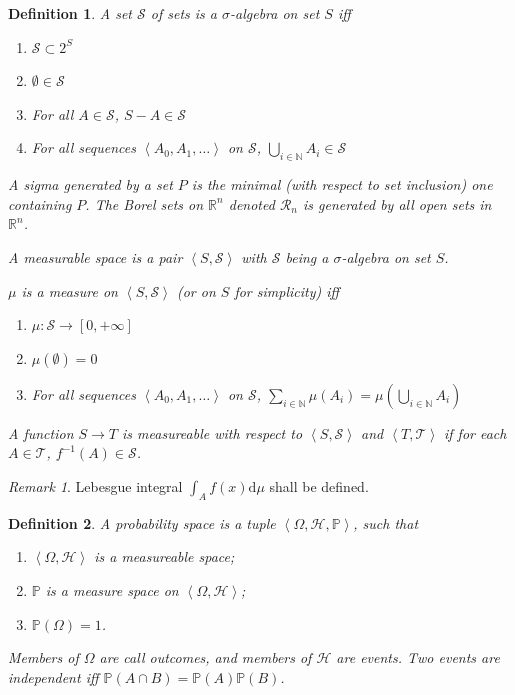 \documentclass{book}
\newtheorem{definition}{Definition}
\theoremstyle{definition}\newtheorem{mechanism}{Mechanism}
\theoremstyle{remark}\newtheorem*{remark}{Remark}
\begin{document}
\begin{definition}
	A set $\mathcal S$ of sets is a $\sigma$-algebra on set $S$ iff
	
	\begin{enumerate}
		\item $\mathcal S\subset 2^S$
		\item $\emptyset \in \mathcal S$
		\item For all $A \in \mathcal S$, $S - A \in \mathcal S$
		\item For all sequences $\left<A_0, A_1, \dots\right>$ on $\mathcal S$, $\bigcup_{i\in\mathbb N} A_i\in \mathcal S$
	\end{enumerate}
	
	A sigma generated by a set $P$ is the minimal (with respect to set inclusion) one containing $P$. The Borel sets on $\mathbb R^n$ denoted $\mathcal R_n$ is generated by all open sets in $\mathbb R^n$.
	
	A measurable space is a pair $\left<S, \mathcal S\right>$ with $\mathcal S$ being a $\sigma$-algebra on set $S$.
	
	$\mu$ is a measure on $\left<S, \mathcal S\right>$ (or on $S$ for simplicity) iff
	
	\begin{enumerate}
		\item $\mu: \mathcal S\to [0, +\infty]$
		\item $\mu(\emptyset) = 0$
		\item For all sequences $\left<A_0, A_1, \dots\right>$ on $\mathcal S$, $\sum_{i\in\mathbb N}\mu(A_i) = \mu(\bigcup_{i\in\mathbb N} A_i)$
	\end{enumerate}
	
	A function $S\to T$ is measureable with respect to $\left<S, \mathcal S\right>$ and $\left<T, \mathcal T\right>$ if for each $A\in \mathcal T$, $f^{-1}(A) \in \mathcal S$.
\end{definition}

\begin{remark}
	Lebesgue integral $\int_A f(x)\mathrm{d}\mu$ shall be defined.
\end{remark}

\begin{definition}
	A probability space is a tuple $\left<\Omega, \mathcal H, \mathbb P\right>$, such that
	
	\begin{enumerate}
		\item $\left<\Omega, \mathcal H\right>$ is a measureable space;
		\item $\mathbb P$ is a measure space on $\left<\Omega, \mathcal H\right>$;
		\item $\mathbb P(\Omega) = 1$.
	\end{enumerate}
	
	Members of $\Omega$ are call outcomes, and members of $\mathcal H$ are events. Two events are independent iff $\mathbb P(A\cap B) = \mathbb P(A) \mathbb P(B)$.
\end{definition}
\end{document}
